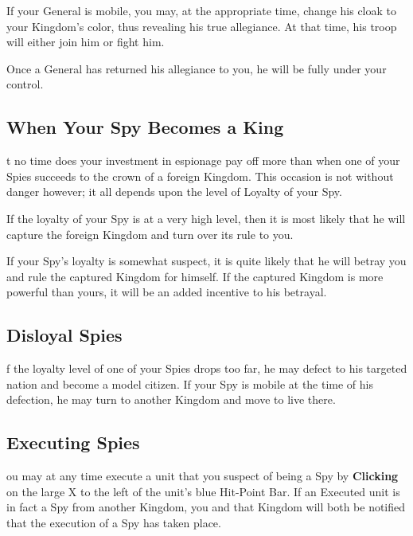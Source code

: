 If your General is mobile, you may, at the appropriate time, change his cloak to your Kingdom’s color, thus revealing his true allegiance. At that time, his troop will either join him or fight him.

Once a General has returned his allegiance to you, he will be fully under your control.

\subsection{\textsf{When Your Spy Becomes a King}}


t no time does your investment in espionage pay off more than when one of your Spies succeeds to the crown of a foreign Kingdom. This occasion is not without danger however; it all depends upon the level of Loyalty of your Spy.

If the loyalty of your Spy is at a very high level, then it is most likely that he will capture the foreign Kingdom and turn over its rule to you.

If your Spy’s loyalty is somewhat suspect, it is quite likely that he will betray you and rule the captured Kingdom for himself. If the captured Kingdom is more powerful than yours, it will be an added incentive to his betrayal.

\subsection{\textsf{Disloyal Spies}}


f the loyalty level of one of your Spies drops too far, he may defect to his targeted nation and become a model citizen. If your Spy is mobile at the time of his defection, he may turn to another Kingdom and move to live there.

\subsection{\textsf{Executing Spies}}


ou may at any time execute a unit that you suspect of being a Spy by \textbf{Clicking} on the large X to the left of the unit’s blue Hit-Point Bar. If an Executed unit is in fact a Spy from another Kingdom, you and that Kingdom will both be notified that the execution of a Spy has taken place.

